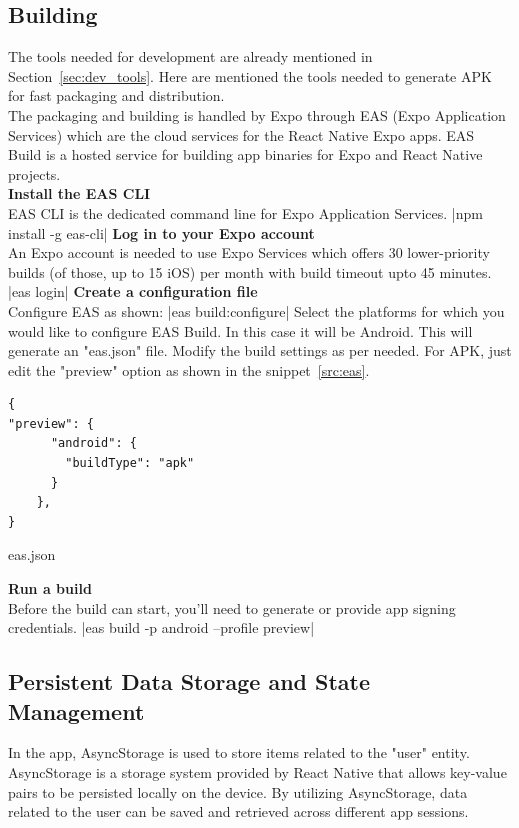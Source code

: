 \subsection{Building}\label{subsec:build}
The tools needed for development are already mentioned in Section~\ref{sec:dev_tools}. Here are mentioned the tools needed to generate APK for fast packaging and distribution.\\
The packaging and building is handled by Expo through EAS (Expo Application Services) which are the cloud services for the React Native Expo apps. EAS Build is a hosted service for building app binaries for Expo and React Native projects. \cite{easdoc}\\
\textbf{Install the EAS CLI}\\
EAS CLI is the dedicated command line for Expo Application Services.
|npm install -g eas-cli|
\textbf{Log in to your Expo account}\\
An Expo account is needed to use Expo Services which offers 30 lower-priority builds (of those, up to 15 iOS) per month with build timeout upto 45 minutes.
|eas login|
\textbf{Create a configuration file}\\
Configure EAS as shown:
|eas build:configure|
Select the platforms for which you would like to configure EAS Build. In this case it will be Android. This will generate an "eas.json" file. Modify the build settings as per needed. For APK, just edit the "preview" option as shown in the snippet~\ref{src:eas}.
\begin{listing}[H]
\begin{verbatim} 
{
"preview": {
      "android": {
        "buildType": "apk"
      }
    },
}
\end{verbatim}
\caption{eas.json}
\label{src:eas}
\end{listing}

\textbf{Run a build}\\
Before the build can start, you’ll need to generate or provide app signing credentials. \cite{eascred}
|eas build -p android --profile preview|
\subsection{Persistent Data Storage and State Management}\label{subsec:storage}
In the app, AsyncStorage is used to store items related to the "user" entity. AsyncStorage is a storage system provided by React Native that allows key-value pairs to be persisted locally on the device. By utilizing AsyncStorage, data related to the user can be saved and retrieved across different app sessions.


